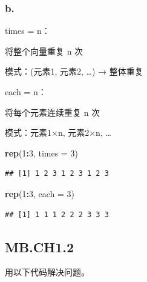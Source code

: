 \documentclass[
]{article}
\newenvironment{Shaded}{\begin{snugshade}}{\end{snugshade}}
\newcommand{\AttributeTok}[1]{\textcolor[rgb]{0.13,0.29,0.53}{#1}}
\newcommand{\DecValTok}[1]{\textcolor[rgb]{0.00,0.00,0.81}{#1}}
\newcommand{\FunctionTok}[1]{\textcolor[rgb]{0.13,0.29,0.53}{\textbf{#1}}}
\newcommand{\NormalTok}[1]{#1}
\newcommand{\SpecialCharTok}[1]{\textcolor[rgb]{0.81,0.36,0.00}{\textbf{#1}}}
\begin{document}
\subsubsection{b.}\label{b.-2}

times = n：

将整个向量重复 n 次

模式：(元素1, 元素2, \ldots) → 整体重复

each = n：

将每个元素连续重复 n 次

模式：元素1×n, 元素2×n, \ldots{}

\begin{Shaded}
\begin{Highlighting}[]
\FunctionTok{rep}\NormalTok{(}\DecValTok{1}\SpecialCharTok{:}\DecValTok{3}\NormalTok{, }\AttributeTok{times =} \DecValTok{3}\NormalTok{) }
\end{Highlighting}
\end{Shaded}

\begin{verbatim}
## [1] 1 2 3 1 2 3 1 2 3
\end{verbatim}

\begin{Shaded}
\begin{Highlighting}[]
\FunctionTok{rep}\NormalTok{(}\DecValTok{1}\SpecialCharTok{:}\DecValTok{3}\NormalTok{, }\AttributeTok{each =} \DecValTok{3}\NormalTok{)}
\end{Highlighting}
\end{Shaded}

\begin{verbatim}
## [1] 1 1 1 2 2 2 3 3 3
\end{verbatim}

\subsection{MB.CH1.2}\label{mb.ch1.2}

用以下代码解决问题。
\end{document}
